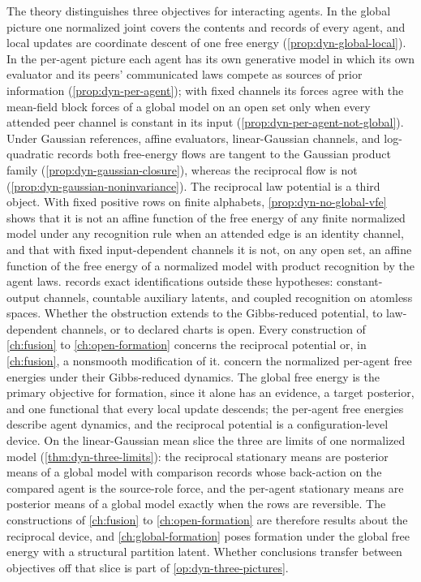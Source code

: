 The theory distinguishes three objectives for interacting agents. In the global picture one normalized joint covers the contents and records of every agent, and local updates are coordinate descent of one free energy (\cref{prop:dyn-global-local}). In the per-agent picture each agent has its own generative model in which its own evaluator and its peers' communicated laws compete as sources of prior information (\cref{prop:dyn-per-agent}); with fixed channels its forces agree with the mean-field block forces of a global model on an open set only when every attended peer channel is constant in its input (\cref{prop:dyn-per-agent-not-global}). Under Gaussian references, affine evaluators, linear-Gaussian channels, and log-quadratic records both free-energy flows are tangent to the Gaussian product family (\cref{prop:dyn-gaussian-closure}), whereas the reciprocal flow is not (\cref{prop:dyn-gaussian-noninvariance}). The reciprocal law potential is a third object. With fixed positive rows on finite alphabets, \cref{prop:dyn-no-global-vfe} shows that it is not an affine function of the free energy of any finite normalized model under any recognition rule when an attended edge is an identity channel, and that with fixed input-dependent channels it is not, on any open set, an affine function of the free energy of a normalized model with product recognition by the agent laws.  records exact identifications outside these hypotheses: constant-output channels, countable auxiliary latents, and coupled recognition on atomless spaces. Whether the obstruction extends to the Gibbs-reduced potential, to law-dependent channels, or to declared charts is open. Every construction of \cref{ch:fusion} to \cref{ch:open-formation} concerns the reciprocal potential or, in \cref{ch:fusion}, a nonsmooth modification of it.  concern the normalized per-agent free energies under their Gibbs-reduced dynamics. The global free energy is the primary objective for formation, since it alone has an evidence, a target posterior, and one functional that every local update descends; the per-agent free energies describe agent dynamics, and the reciprocal potential is a configuration-level device. On the linear-Gaussian mean slice the three are limits of one normalized model (\cref{thm:dyn-three-limits}): the reciprocal stationary means are posterior means of a global model with comparison records whose back-action on the compared agent is the source-role force, and the per-agent stationary means are posterior means of a global model exactly when the rows are reversible. The constructions of \cref{ch:fusion} to \cref{ch:open-formation} are therefore results about the reciprocal device, and \cref{ch:global-formation} poses formation under the global free energy with a structural partition latent. Whether conclusions transfer between objectives off that slice is part of \cref{op:dyn-three-pictures}.

